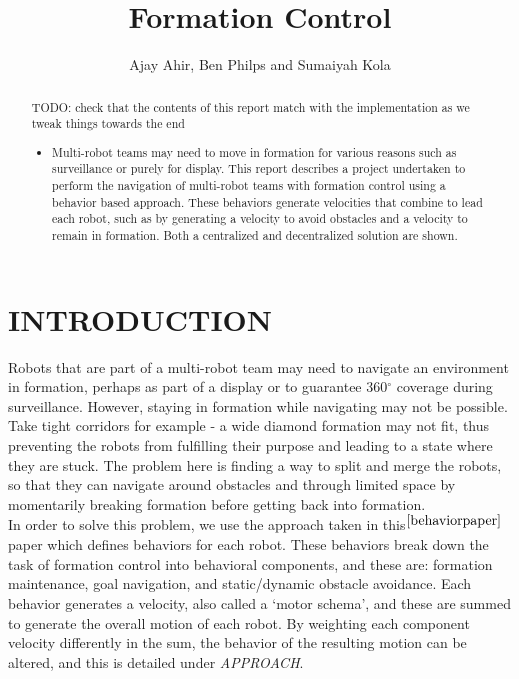 \documentclass[letterpaper, 10 pt, conference]{ieeeconf}  %
\title{\LARGE \bf Formation Control}
\author{Ajay Ahir, Ben Philps and Sumaiyah Kola}
\begin{document}
\maketitle
\thispagestyle{empty}
\pagestyle{empty}

\begin{abstract}

TODO: check that the contents of this report match with the implementation as we tweak things towards the end

\begin{itemize}
\item Multi-robot teams may need to move in formation for various reasons such as surveillance or purely for display. This report describes a project undertaken to perform the navigation of multi-robot teams with formation control using a behavior based approach. These behaviors generate velocities that combine to lead each robot, such as by generating a velocity to avoid obstacles and a velocity to remain in formation. Both a centralized and decentralized solution are shown.
\end{itemize}

\end{abstract}

\section{INTRODUCTION}

Robots that are part of a multi-robot team may need to navigate an environment in formation, perhaps as part of a display or to guarantee 360$^{\circ}$ coverage during surveillance. However, staying in formation while navigating may not be possible. Take tight corridors for example - a wide diamond formation may not fit, thus preventing the robots from fulfilling their purpose and leading to a state where they are stuck. The problem here is finding a way to split and merge the robots, so that they can navigate around obstacles and through limited space by momentarily breaking formation before getting back into formation. \\

In order to solve this problem, we use the approach taken in this$^{\cite{behaviorpaper}}$ paper which defines behaviors for each robot. These behaviors break down the task of formation control into behavioral components, and these are: formation maintenance, goal navigation, and static/dynamic obstacle avoidance. Each behavior generates a velocity, also called a `motor schema', and these are summed to generate the overall motion of each robot. By weighting each component velocity differently in the sum, the behavior of the resulting motion can be altered, and this is detailed under \textit{APPROACH}. \\
\end{document}
